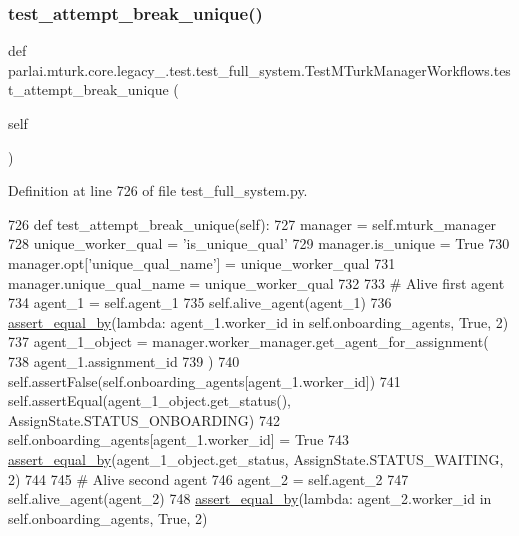 \subsubsection{\texorpdfstring{test\+\_\+attempt\+\_\+break\+\_\+unique()}{test\_attempt\_break\_unique()}}
{\footnotesize\ttfamily def parlai.\+mturk.\+core.\+legacy\+\_.\+test.\+test\+\_\+full\+\_\+system.\+Test\+M\+Turk\+Manager\+Workflows.\+test\+\_\+attempt\+\_\+break\+\_\+unique (\begin{DoxyParamCaption}\item[{}]{self }\end{DoxyParamCaption})}



Definition at line 726 of file test\+\_\+full\+\_\+system.\+py.


\begin{DoxyCode}
726     \textcolor{keyword}{def }test\_attempt\_break\_unique(self):
727         manager = self.mturk\_manager
728         unique\_worker\_qual = \textcolor{stringliteral}{'is\_unique\_qual'}
729         manager.is\_unique = \textcolor{keyword}{True}
730         manager.opt[\textcolor{stringliteral}{'unique\_qual\_name'}] = unique\_worker\_qual
731         manager.unique\_qual\_name = unique\_worker\_qual
732 
733         \textcolor{comment}{# Alive first agent}
734         agent\_1 = self.agent\_1
735         self.alive\_agent(agent\_1)
736         \hyperlink{namespaceparlai_1_1mturk_1_1core_1_1test_1_1test__full__system_a0b463246d35658a2e422010f13dcf819}{assert\_equal\_by}(\textcolor{keyword}{lambda}: agent\_1.worker\_id \textcolor{keywordflow}{in} self.onboarding\_agents, \textcolor{keyword}{True}, 2)
737         agent\_1\_object = manager.worker\_manager.get\_agent\_for\_assignment(
738             agent\_1.assignment\_id
739         )
740         self.assertFalse(self.onboarding\_agents[agent\_1.worker\_id])
741         self.assertEqual(agent\_1\_object.get\_status(), AssignState.STATUS\_ONBOARDING)
742         self.onboarding\_agents[agent\_1.worker\_id] = \textcolor{keyword}{True}
743         \hyperlink{namespaceparlai_1_1mturk_1_1core_1_1test_1_1test__full__system_a0b463246d35658a2e422010f13dcf819}{assert\_equal\_by}(agent\_1\_object.get\_status, AssignState.STATUS\_WAITING, 2)
744 
745         \textcolor{comment}{# Alive second agent}
746         agent\_2 = self.agent\_2
747         self.alive\_agent(agent\_2)
748         \hyperlink{namespaceparlai_1_1mturk_1_1core_1_1test_1_1test__full__system_a0b463246d35658a2e422010f13dcf819}{assert\_equal\_by}(\textcolor{keyword}{lambda}: agent\_2.worker\_id \textcolor{keywordflow}{in} self.onboarding\_agents, \textcolor{keyword}{True}, 2)

\end{DoxyCode}
